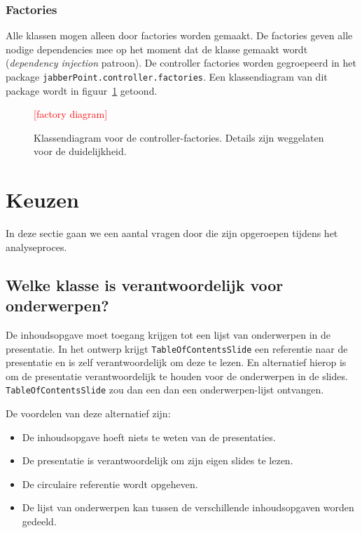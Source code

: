\documentclass[a4paper]{article}
\newcommand{\todo}[1]{\textcolor{red}{[#1]}\\}
\newcommand{\question}[1]{
  \subsection{#1}
}
\newcommand{\code}[1]{\lstinline[columns=fixed]{#1}}
\begin{document}
		\subsubsection{Factories}\label{sec:controller-factories}
			Alle klassen mogen alleen door factories worden gemaakt.
			De factories geven alle nodige dependencies mee op het moment dat de klasse gemaakt wordt (\textit{dependency injection} patroon).
			De controller factories worden gegroepeerd in het package \code{jabberPoint.controller.factories}.
			Een klassendiagram van dit package wordt in figuur~\ref{diagram:controller-factories} getoond.

			\begin{figure}[!htb]
			 \caption{
				Klassendiagram voor de controller-factories.\label{diagram:controller-factories}
				Details zijn weggelaten voor de duide\-lijk\-heid.
			 }
			 \todo{factory diagram} %
			\end{figure}


\section{Keuzen}\label{sec:keuzen}
    In deze sectie gaan we een aantal vragen door die zijn opgeroepen tijdens het analyseproces.
   
    \question{Welke klasse is verantwoordelijk voor onderwerpen?}
		De inhoudsopgave moet toegang krijgen tot een lijst van onderwerpen in de presentatie.
		In het ontwerp krijgt \code{TableOfContentsSlide} een referentie naar de presentatie en is zelf verantwoordelijk om deze te lezen.
		En alternatief hierop is om de presentatie verantwoordelijk te houden voor de onderwerpen in de slides.
		\code{TableOfContentsSlide} zou dan een dan een onderwerpen-lijst ontvangen.

		De voordelen van deze alternatief zijn:
		\begin{itemize}
			\item De inhoudsopgave hoeft niets te weten van de presentaties.
			\item De presentatie is verantwoordelijk om zijn eigen slides te lezen.
			\item De circulaire referentie wordt opgeheven.
			\item De lijst van onderwerpen kan tussen de verschillende inhoudsopgaven worden gedeeld.
		\end{itemize}
\end{document}
